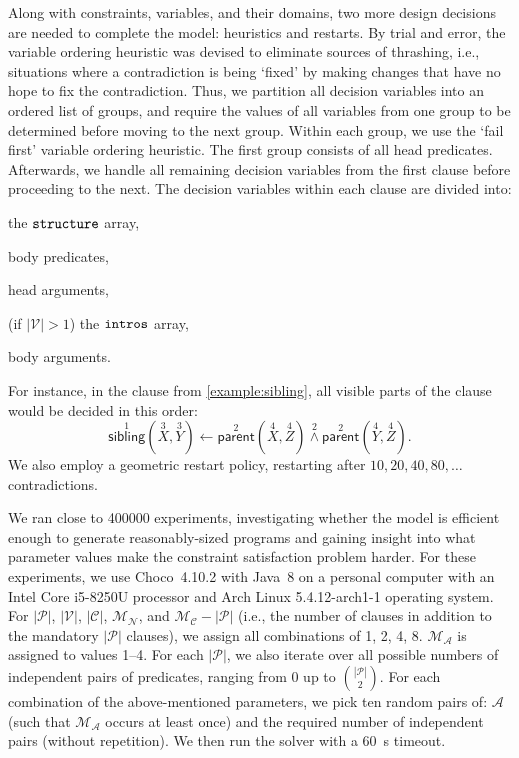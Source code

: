\documentclass[letterpaper]{article}
\theoremstyle{definition}
\newcommand{\variable}[1]{\texttt{\textup{#1}}}
\newcommand{\predicates}{\mathcal{P}}
\newcommand{\variables}{\mathcal{V}}
\newcommand{\constants}{\mathcal{C}}
\newcommand{\arities}{\mathcal{A}}
\newcommand{\maxArity}{\mathcal{M}_{\mathcal{A}}}
\newcommand{\maxNumNodes}{\mathcal{M}_{\mathcal{N}}}
\newcommand{\maxNumClauses}{\mathcal{M}_{\mathcal{C}}}
\begin{document}
Along with constraints, variables, and their domains, two more design decisions
are needed to complete the model: heuristics and restarts. By trial and error,
the variable ordering heuristic was devised to eliminate sources of thrashing,
i.e., situations where a contradiction is being `fixed' by making changes that
have no hope to fix the contradiction. Thus, we partition all decision variables
into an ordered list of groups, and require the values of all variables from one
group to be determined before moving to the next group. Within each group, we
use the `fail first' variable ordering heuristic. The first group consists of
all head predicates. Afterwards, we handle all remaining decision variables from
the first clause before proceeding to the next. The decision variables within
each clause are divided into:
\begin{enumerate*}
\item the $\variable{structure}$ array,
\item body predicates,
\item head arguments,
\item (if $|\variables{}| > 1$) the $\variable{intros}$ array,
\item body arguments.
\end{enumerate*}
For instance, in the clause from \cref{example:sibling}, all visible parts of
the clause would be decided in this order:
\[
  \overset{1}{\mathsf{sibling}}(\overset{3}{X}, \overset{3}{Y}) \gets
  \overset{2}{\mathsf{parent}}(\overset{4}{X}, \overset{4}{Z})
  \overset{2}{\land} \overset{2}{\mathsf{parent}}(\overset{4}{Y},
  \overset{4}{Z}).
\]
We also employ a geometric restart policy, restarting after $10, 20, 40,
80, \dots$ contradictions.

We ran close to \num{400000} experiments, investigating whether the model is
efficient enough to generate reasonably-sized programs and gaining insight into
what parameter values make the constraint satisfaction problem harder. For these
experiments, we use Choco~4.10.2 \citep{choco} with Java~8 on a personal
computer with an Intel Core i5-8250U processor and Arch Linux 5.4.12-arch1-1
operating system. For $|\predicates{}|$, $|\variables{}|$, $|\constants{}|$,
$\maxNumNodes{}$, and $\maxNumClauses{} - |\predicates{}|$ (i.e., the number of
clauses in addition to the mandatory $|\predicates{}|$ clauses), we assign all
combinations of 1, 2, 4, 8. $\maxArity{}$ is assigned to values 1--4. For each
$|\predicates{}|$, we also iterate over all possible numbers of independent
pairs of predicates, ranging from 0 up to $\binom{|\predicates{}|}{2}$. For each
combination of the above-mentioned parameters, we pick ten random pairs of:
$\arities{}$ (such that $\maxArity{}$ occurs at least once) and the required
number of independent pairs (without repetition). We then run the solver with a
\SI{60}{\second} timeout.
\end{document}
